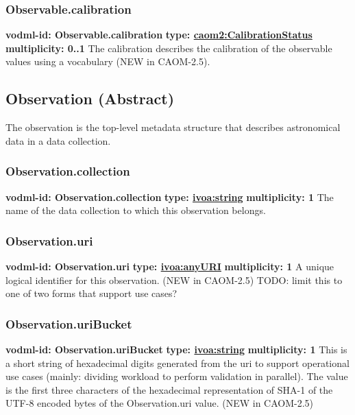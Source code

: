     \subsubsection{Observable.calibration}
      \textbf{vodml-id: Observable.calibration} \newline
      \textbf{type: \hyperref[sect:CalibrationStatus]{caom2:CalibrationStatus}} \newline
      \textbf{multiplicity: 0..1} \newline
      The calibration describes the calibration of the observable values using a vocabulary (NEW in CAOM-2.5).

  \subsection{Observation (Abstract)}
  \label{sect:Observation}
    The observation is the top-level metadata structure that describes astronomical data in a data collection.

    \subsubsection{Observation.collection}
      \textbf{vodml-id: Observation.collection} \newline
      \textbf{type: \hyperref[sect:ivoa]{ivoa:string}} \newline
      \textbf{multiplicity: 1} \newline
      The name of the data collection to which this observation belongs.

    \subsubsection{Observation.uri}
      \textbf{vodml-id: Observation.uri} \newline
      \textbf{type: \hyperref[sect:ivoa]{ivoa:anyURI}} \newline
      \textbf{multiplicity: 1} \newline
      A unique logical identifier for this observation. (NEW in CAOM-2.5) TODO: limit this to one of two forms that support use cases?

    \subsubsection{Observation.uriBucket}
      \textbf{vodml-id: Observation.uriBucket} \newline
      \textbf{type: \hyperref[sect:ivoa]{ivoa:string}} \newline
      \textbf{multiplicity: 1} \newline
      This is a short string of hexadecimal digits generated from the uri to support operational use cases (mainly: dividing workload to perform validation in parallel). The value is the first three characters of the hexadecimal representation of SHA-1 of the UTF-8 encoded bytes of the Observation.uri value. (NEW in CAOM-2.5)

